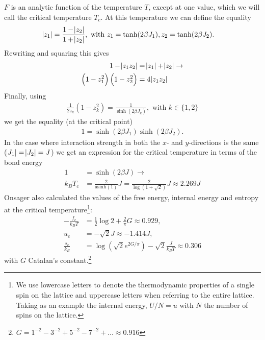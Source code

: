 \documentclass[11pt, a4paper]{report} %
\begin{document}
\(F\) is an analytic function of the temperature \(T\), except at one value, which we will call the critical temperature \(T_c\). At this temperature we can define the equality \cite{mccoy:1973}
\begin{align}
	\abs{z_1} &= \frac{1 - \abs{z_2}}{1+ \abs{z_2}}, \text{ with } z_1 = \tanh(2\beta J_1), z_2 = \tanh(2\beta J_2).
\end{align}
Rewriting and squaring this gives
\begin{align}
	\label{eq:ising_z_functions}
	1 - \abs{z_1 z_2} &= \abs{z_1} + \abs{z_2}\rightarrow\\
	\left(1 - z_1^2 \right) \left(1 - z_2^2 \right) &= 4 \abs{z_1 z_2}
\end{align}
Finally, using
\begin{align}
	\frac{1}{2 z_k}\left(1 - z_k^2\right) = \frac{1}{\sinh(2 \beta J_k)}, \text{ with } k \in \{{1, 2}\}
\end{align}
we get the equality (at the critical point)
\begin{align}
	1 = \sinh(2\beta J_1) \sinh(2\beta J_2).
\end{align}
In the case where interaction strength in both the \(x\)- and \(y\)-directions is the same (\(\abs{J_1} = \abs{J_2} = J\)) we get an expression for the critical temperature in terms of the bond energy
\begin{align}
	1 &= \sinh(2\beta J) \to \\
	k_B T_c &= \frac{2}{\text{asinh}(1)}J = \frac{2}{\log(1+\sqrt{2})}J \approx 2.269 J
\end{align}
Onsager \cite{onsager:1944} also calculated the values of the free energy, internal energy and entropy at the critical temperature\footnote{We use lowercase letters to denote the thermodynamic properties of a single spin on the lattice and uppercase letters when referring to the entire lattice. Taking as an example the internal energy, \(U/N = u\) with \(N\) the number of spins on the lattice.}:
\begin{align}
	-\frac{f_c}{k_B T} &= \frac{1}{2} \log{2} + \frac{2}{\pi} G \approx 0.929, \\
	u_c &= - \sqrt{2} J \approx - 1.414 J,\\
	\frac{s_c}{k_B} &= \log{(\sqrt{2} e^{2G/\pi})} - \sqrt{2} \frac{J}{k_B T} \approx 0.306
\end{align}
with \(G\) Catalan's constant.\footnote{\(G = 1^{-2} - 3^{-2} + 5^{-2} - 7^{-2} +\ldots \approx 0.916\)}
\end{document}
